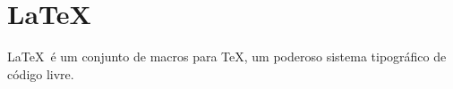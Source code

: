 \section{\LaTeX}

\LaTeX \ é um conjunto de macros para \TeX, um poderoso sistema tipográfico
de código livre.
